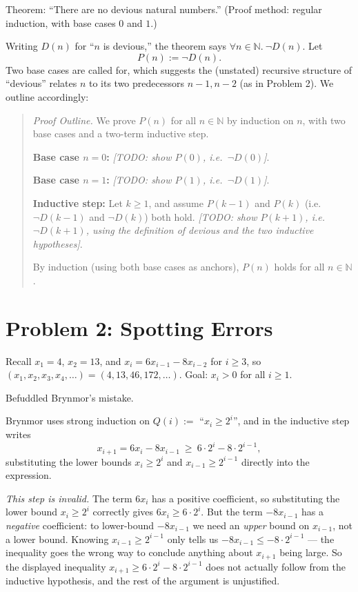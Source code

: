 \documentclass[11pt]{article}
\newcommand{\N}{\mathbb{N}}
\newcommand{\TODO}[1]{\emph{[TODO: #1]}}
\newcommand{\partlabel}[1]{%
    \noindent\makebox[2em][l]{\textbf{(#1)}}%
}
\begin{document}
\bigskip
\partlabel{c}
Theorem: ``There are no devious natural numbers.'' (Proof method: regular induction, with base cases $0$ and $1$.)

Writing $D(n)$ for ``$n$ is devious,'' the theorem says $\forall n \in \N.\ \neg D(n)$. Let
\[
P(n) := \neg D(n).
\]
Two base cases are called for, which suggests the (unstated) recursive structure of ``devious'' relates $n$ to its two predecessors $n-1, n-2$ (as in Problem 2). We outline accordingly:

\begin{quote}
\textit{Proof Outline.} We prove $P(n)$ for all $n \in \N$ by induction on $n$, with two base cases and a two-term inductive step.

\textbf{Base case $n = 0$:} \TODO{show $P(0)$, i.e.\ $\neg D(0)$}.

\textbf{Base case $n = 1$:} \TODO{show $P(1)$, i.e.\ $\neg D(1)$}.

\textbf{Inductive step:} Let $k \ge 1$, and assume $P(k-1)$ and $P(k)$ (i.e.\ $\neg D(k-1)$ and $\neg D(k)$) both hold. \TODO{show $P(k+1)$, i.e.\ $\neg D(k+1)$, using the definition of devious and the two inductive hypotheses}.

By induction (using both base cases as anchors), $P(n)$ holds for all $n \in \N$.
\end{quote}

\newpage
\section*{Problem 2: Spotting Errors}

Recall $x_1 = 4$, $x_2 = 13$, and $x_i = 6x_{i-1} - 8x_{i-2}$ for $i \ge 3$, so $(x_1,x_2,x_3,x_4,\dots) = (4,13,46,172,\dots)$. Goal: $x_i > 0$ for all $i \ge 1$.

\medskip
\partlabel{a}
Befuddled Brynmor's mistake.

Brynmor uses strong induction on $Q(i) := $ ``$x_i \ge 2^i$'', and in the inductive step writes
\[
x_{i+1} = 6x_i - 8x_{i-1} \ \ge\ 6\cdot 2^i - 8 \cdot 2^{i-1},
\]
substituting the lower bounds $x_i \ge 2^i$ and $x_{i-1} \ge 2^{i-1}$ directly into the expression.

\emph{This step is invalid.} The term $6x_i$ has a positive coefficient, so substituting the lower bound $x_i \ge 2^i$ correctly gives $6x_i \ge 6\cdot 2^i$. But the term $-8x_{i-1}$ has a \emph{negative} coefficient: to lower-bound $-8x_{i-1}$ we need an \emph{upper} bound on $x_{i-1}$, not a lower bound. Knowing $x_{i-1} \ge 2^{i-1}$ only tells us $-8x_{i-1} \le -8\cdot 2^{i-1}$ — the inequality goes the wrong way to conclude anything about $x_{i+1}$ being large. So the displayed inequality $x_{i+1} \ge 6\cdot 2^i - 8\cdot 2^{i-1}$ does not actually follow from the inductive hypothesis, and the rest of the argument is unjustified.
\end{document}
